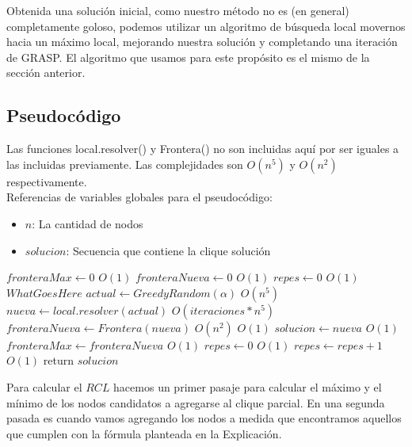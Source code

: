 Obtenida una solución inicial, como nuestro método no es (en general) completamente goloso, podemos utilizar un algoritmo de búsqueda local movernos hacia un máximo local, mejorando nuestra solución y completando una iteración de GRASP. El algoritmo que usamos para este propósito es el mismo de la sección anterior.

\subsection{Pseudocódigo}

Las funciones local.resolver() y Frontera() no son incluidas aquí por ser iguales a las incluidas previamente. Las complejidades son $O(n^5)$ y $O(n^2)$ respectivamente. \\

Referencias de variables globales para el pseudocódigo:
\begin{itemize}
    \item $n$: La cantidad de nodos
    \item $solucion$: Secuencia que contiene la clique solución
\end{itemize}


\begin{algorithm}[H]
\begin{algorithmic}
    \State $fronteraMax \gets 0$   \Comment $O(1)$
    \State $fronteraNueva \gets 0$   \Comment $O(1)$
    \State $repes \gets 0$   \Comment $O(1)$
      \Comment $What Goes Here$
        \State $actual \gets GreedyRandom(\alpha)$  \Comment $O(n^5)$
        \State $nueva \gets local.resolver(actual)$  \Comment $O(iteraciones * n^5)$
        \State $fronteraNueva \gets Frontera(nueva)$  \Comment $O(n^2)$
           \Comment $O(1)$
            \State $solucion \gets nueva$   \Comment $O(1)$
            \State $fronteraMax \gets fronteraNueva$   \Comment $O(1)$
            \State $repes \gets 0$   \Comment $O(1)$
        \Else
            \State $repes \gets repes + 1$   \Comment $O(1)$
        \EndIf
    \EndWhile
    \State return $solucion$
\EndFunction
\end{algorithmic}
\end{algorithm}

Para calcular el $RCL$ hacemos un primer pasaje para calcular el máximo y el mínimo de los nodos candidatos a agregarse al clique parcial. En una segunda pasada es cuando vamos agregando los nodos a medida que encontramos aquellos que cumplen con la fórmula planteada en la Explicación.

